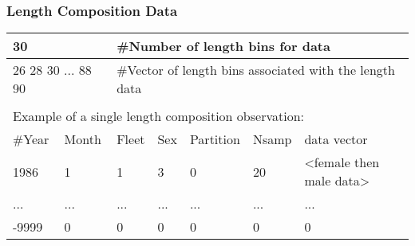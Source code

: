 \hypertarget{CompTiming}{}
\subsubsection{Length Composition Data}
\begin{center}
	\begin{tabular}{p{1.5cm} p{1.5cm} p{1.5cm} p{1.5cm} p{1.5cm} p{1.5cm} p{5cm}}
		\hline
		\multicolumn{2}{l}{30} & \multicolumn{5}{l}{\#Number of length bins for data}\\
		\hline
		\multicolumn{2}{l}{26 28 30 ... 88 90} &  \multicolumn{5}{l}{\#Vector of length bins associated with the length data}\\
		\hline
		\\
		\multicolumn{7}{l}{Example of a single length composition observation:} \\
		\hline
		\#Year & Month & Fleet & Sex & Partition & Nsamp & data vector\\
		\hline
		1986 & 1 & 1 & 3 & 0 & 20 & <female then male data> \\
		... & ...& ... & ... & ...& ... & ... \\
		-9999 & 0 & 0 & 0 & 0 & 0 & 0 \\
		\hline	
	\end{tabular}
\end{center}

